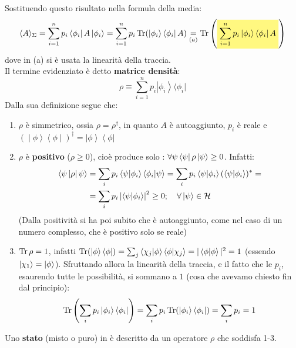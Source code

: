 \documentclass[../../FisicaTeorica.tex]{subfiles}
\begin{document}
Sostituendo questo risultato nella formula della media:
\[
\langle A \rangle_\Sigma = \sum_{i=1}^n p_i \bra{\phi_i}A\ket{\phi_i} = \sum_{i=1}^n p_i \op{Tr}(\ket{\phi_i}\bra{\phi_i}A) \underset{(a)}{=} \op{Tr}\left( \hlc{Yellow}{\sum_{i=1}^n p_i \ket{\phi_i}\bra{\phi_i}A}\right )
\]
dove in (a) si è usata la linearità della traccia.\\
Il termine evidenziato è detto \textbf{matrice densità}:
\[
\rho \equiv \sum_{i=1}^{n}{p_i\left|\phi_i\right\rangle\langle\phi_i|}
\]
Dalla sua definizione segue che: 
\begin{enumerate}
    \item $\rho$ è simmetrico, ossia $\displaystyle \rho = \rho^\dag$, in quanto $A$ è autoaggiunto, $p_i$ è reale e $\left(\middle|\phi\right\rangle{\left\langle\phi\middle|\right)}^\dag=\left|\phi\right\rangle\left\langle\phi\right|$
	\item $\rho$ è \textbf{positivo} ($\rho \geq 0$), cioè produce solo : $\forall \psi \left\langle\psi\right|\rho \ket{\psi}\geq 0$. Infatti:
	\begin{align*}
	    \left\langle\psi\left|\rho\right|\psi\right\rangle&=\sum_{i}p_i\left\langle\psi\middle|\phi_i\right\rangle\left\langle\phi_i\middle|\psi\right\rangle=
	    \sum_i p_i \braket{\psi|\phi_i}(\braket{\psi|\phi_i})^* =
	    \\
	    &=\sum_{i}p_i\left|\left\langle\psi\middle|\phi_i\right\rangle\right|^2\geq0; \quad \forall \ket{\psi}\in \mathcal{H}
	\end{align*}
	(Dalla positività si ha poi subito che è autoaggiunto, come nel caso di un numero complesso, che è positivo solo se reale)
	\item $\displaystyle \operatorname{Tr}\rho = 1$, infatti  $\operatorname{Tr}(\ket{\phi}\bra{\phi}) = \sum_j \braket{\chi_j|\phi}\braket{\phi|\chi_j} = |\braket{\phi|\phi}|^2 = 1$ (essendo $\ket{\chi_1} = \ket{\phi}$). Sfruttando allora la linearità della traccia, e il fatto che le $p_i$, esaurendo tutte le possibilità, si sommano a $1$ (cosa che avevamo chiesto fin dal principio):
	\[
	\operatorname{Tr}\left(\sum_i p_i \ket{\phi_i}\bra{\phi_i}\right) = \sum_i p_i \operatorname{Tr}(\ket{\phi_i}\bra{\phi_i}) = \sum_i p_i = 1
	\]
\end{enumerate}
\begin{dfn}
Uno \textbf{stato} (misto o puro) in \MQ è descritto da un operatore $\rho$ che soddisfa 1-3.
\end{dfn}
\end{document}
